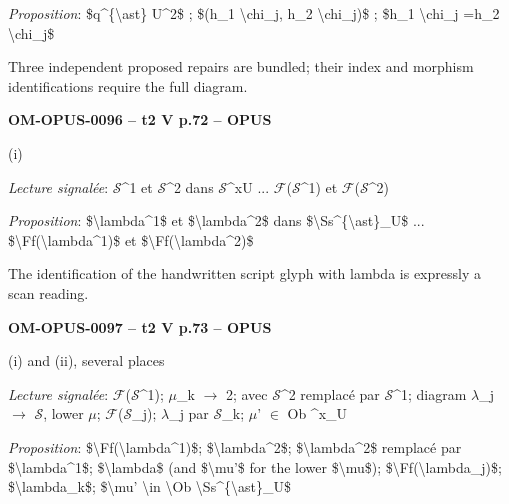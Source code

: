 \emph{Proposition}: \$q\textasciicircum{}\{\textbackslash{}ast\} U\textasciicircum{}2\$ ; \$(h\_1 \textbackslash{}chi\_j, h\_2 \textbackslash{}chi\_j)\$ ; \$h\_1 \textbackslash{}chi\_j =\allowbreak  h\_2 \textbackslash{}chi\_j\$\par
Three independent proposed repairs are bundled; their index and morphism identifications require the full diagram.\par
\par\noindent\textbf{OM-OPUS-0096 -- t2 V p.72 -- OPUS}\par
(i)\par
\emph{Lecture signalée}: \ensuremath{𝒮}\textasciicircum{}1 et \ensuremath{𝒮}\textasciicircum{}2 dans \ensuremath{𝒮}\textasciicircum{}xU ... \ensuremath{\mathcal{F}}(\ensuremath{𝒮}\textasciicircum{}1) et \ensuremath{\mathcal{F}}(\ensuremath{𝒮}\textasciicircum{}2)\par
\emph{Proposition}: \$\textbackslash{}lambda\textasciicircum{}1\$ et \$\textbackslash{}lambda\textasciicircum{}2\$ dans \$\textbackslash{}Ss\textasciicircum{}\{\textbackslash{}ast\}\_U\$ ... \$\textbackslash{}Ff(\textbackslash{}lambda\textasciicircum{}1)\$ et \$\textbackslash{}Ff(\textbackslash{}lambda\textasciicircum{}2)\$\par
The identification of the handwritten script glyph with lambda is expressly a scan reading.\par
\par\noindent\textbf{OM-OPUS-0097 -- t2 V p.73 -- OPUS}\par
(i) and (ii), several places\par
\emph{Lecture signalée}: \ensuremath{\mathcal{F}}(\ensuremath{𝒮}\textasciicircum{}1); \ensuremath{\mu}\_k \ensuremath{\to} 2; avec \ensuremath{𝒮}\textasciicircum{}2 remplacé par \ensuremath{𝒮}\textasciicircum{}1; diagram \ensuremath{\lambda}\_j \ensuremath{\to} \ensuremath{𝒮}, lower \ensuremath{\mu}; \ensuremath{\mathcal{F}}(\ensuremath{𝒮}\_j); \ensuremath{\lambda}\_j par \ensuremath{𝒮}\_k; \ensuremath{\mu}' \ensuremath{\in} Ob \textasciicircum{}x\_U\par
\emph{Proposition}: \$\textbackslash{}Ff(\textbackslash{}lambda\textasciicircum{}1)\$; \$\textbackslash{}lambda\textasciicircum{}2\$; \$\textbackslash{}lambda\textasciicircum{}2\$ remplacé par \$\textbackslash{}lambda\textasciicircum{}1\$; \$\textbackslash{}lambda\$ (and \$\textbackslash{}mu'\$ for the lower \$\textbackslash{}mu\$); \$\textbackslash{}Ff(\textbackslash{}lambda\_j)\$; \$\textbackslash{}lambda\_k\$; \$\textbackslash{}mu' \textbackslash{}in \textbackslash{}Ob \textbackslash{}Ss\textasciicircum{}\{\textbackslash{}ast\}\_U\$\par
